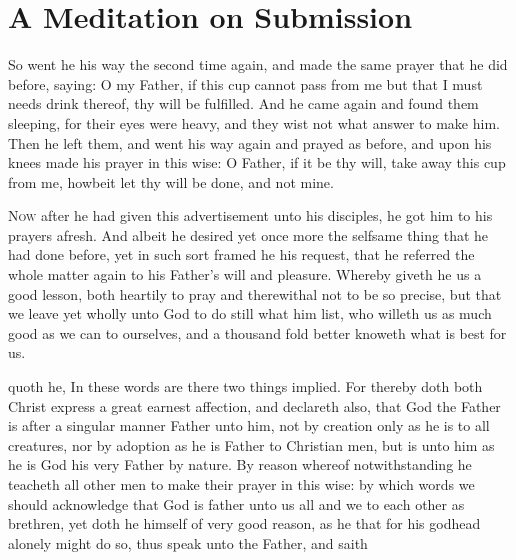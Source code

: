 \documentclass[a5paper]{scrbook}
\begin{document}
	\chapter{A Meditation on Submission}
	
	\begin{scripture}[Mk 14:39-40, Mt 26:42-44]
		So went he his way the second time again, and made the same prayer that he did before, saying: O my Father, if this cup cannot pass from me but that I must needs drink thereof, thy will be fulfilled. And he came again and found them sleeping, for their eyes were heavy, and they wist not what answer to make him. Then he left them, and went his way again and prayed as before, and upon his knees made his prayer in this wise: O Father, if it be thy will, take away this cup from me, howbeit let thy will be done, and not mine.
	\end{scripture}
	
	\vspace{10mm}
	
	\lettrine{N}{ow} after he had given this advertisement unto his disciples, he got him to his prayers afresh. And albeit he desired yet once more the selfsame thing that he had done before, yet in such sort framed he his request, that he referred the whole matter again to his Father's will and pleasure. Whereby giveth he us a good lesson, both heartily to pray and therewithal not to be so precise, but that we leave yet wholly unto God to do still what him list, who willeth us as much good as we can to ourselves, and a thousand fold better knoweth what is best for us.
	
	 quoth he,  In these words  are there two things implied. For thereby doth both Christ express a great earnest affection, and declareth also, that God the Father is after a singular manner Father unto him, not by creation only as he is to all creatures, nor by adoption as he is Father to Christian men, but is unto him as he is God his very Father by nature. By reason whereof notwithstanding he teacheth all other men to make their prayer in this wise:  by which words we should acknowledge that God is father unto us all and we to each other as brethren, yet doth he himself of very good reason, as he that for his godhead alonely might do so, thus speak unto the Father, and saith 
	
\end{document}
